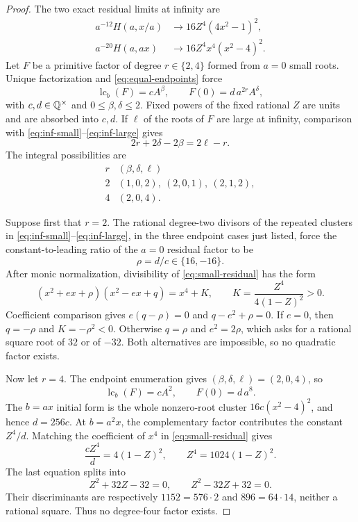\begin{proof}
The two exact residual limits at infinity are
\begin{align}
 a^{-12}H(a,x/a)&\longrightarrow16Z^4(4x^2-1)^2, \label{eq:inf-small}\\
 a^{-20}H(a,ax)&\longrightarrow16Z^4x^4(x^2-4)^2. \label{eq:inf-large}
\end{align}
Let $F$ be a primitive factor of degree $r\in\{2,4\}$ formed from
$a=0$ small roots.  Unique factorization and
\eqref{eq:equal-endpoints} force
\[
 \operatorname{lc}_b(F)=cA^\beta,\qquad
 F(0)=d\,a^{2r}A^\delta,
\]
with $c,d\in\mathbb{Q}^\times$ and $0\le\beta,\delta\le2$.  Fixed powers of the
fixed rational $Z$ are units and are absorbed into $c,d$.  If $\ell$ of
the roots of $F$ are large at infinity, comparison with
\eqref{eq:inf-small}--\eqref{eq:inf-large} gives
\[
 2r+2\delta-2\beta=2\ell-r.
\]
The integral possibilities are
\[
\begin{array}{c|c}
r&(\beta,\delta,\ell)\\ \hline
2&(1,0,2),\ (2,0,1),\ (2,1,2),\\
4&(2,0,4).
\end{array}
\]

Suppose first that $r=2$.  The rational degree-two divisors of the
repeated clusters in \eqref{eq:inf-small}--\eqref{eq:inf-large}, in the
three endpoint cases just listed, force the constant-to-leading ratio of
the $a=0$ residual factor to be
\[
 \rho=d/c\in\{16,-16\}.
\]
After monic normalization, divisibility of \eqref{eq:small-residual} has
the form
\[
 (x^2+ex+\rho)(x^2-ex+q)=x^4+K,\qquad
 K=\frac{Z^4}{4(1-Z)^2}>0.
\]
Coefficient comparison gives
$e(q-\rho)=0$ and $q-e^2+\rho=0$.  If $e=0$, then $q=-\rho$ and
$K=-\rho^2<0$.  Otherwise $q=\rho$ and $e^2=2\rho$, which asks for a
rational square root of $32$ or of $-32$.  Both alternatives are
impossible, so no quadratic factor exists.

Now let $r=4$.  The endpoint enumeration gives
$(\beta,\delta,\ell)=(2,0,4)$, so
\[
 \operatorname{lc}_b(F)=cA^2,\qquad F(0)=d\,a^8.
\]
The $b=ax$ initial form is the whole nonzero-root cluster
$16c(x^2-4)^2$, and hence $d=256c$.  At $b=a^2x$, the complementary
factor contributes the constant $Z^4/d$.  Matching the coefficient of
$x^4$ in \eqref{eq:small-residual} gives
\[
 \frac{cZ^4}{d}=4(1-Z)^2,\qquad
 Z^4=1024(1-Z)^2.                       \label{eq:forced-Z}
\]
The last equation splits into
\[
 Z^2+32Z-32=0,\qquad Z^2-32Z+32=0.
\]
Their discriminants are respectively
$1152=576\cdot2$ and $896=64\cdot14$, neither a rational square.
Thus no degree-four factor exists.


\end{proof}
